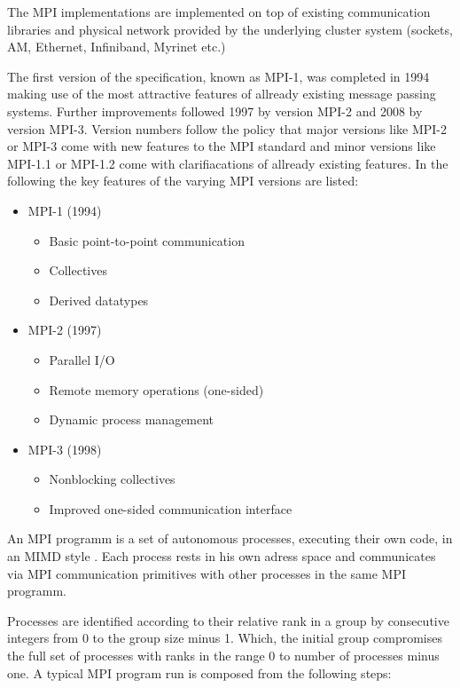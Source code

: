 The MPI implementations are implemented on top of existing communication
libraries and physical network provided by the underlying cluster system (sockets,
AM, Ethernet, Infiniband, Myrinet etc.)

The first version of the specification, known as MPI-1, was completed
in 1994 making use of the most attractive features of allready
existing message passing systems.  Further improvements followed 1997
by version MPI-2 and 2008 by version MPI-3. Version numbers follow
the policy that major versions like MPI-2 or MPI-3 come with new
features to the MPI standard and minor versions like MPI-1.1 or
MPI-1.2 come with clarifiacations of allready existing features. In
the following the key features of the varying MPI versions are listed:

\begin{itemize}
  \item MPI-1 (1994)
    \begin{itemize}
      \item Basic point-to-point communication
      \item Collectives
      \item Derived datatypes
    \end{itemize}
  \item MPI-2 (1997)
    \begin{itemize}
      \item Parallel I/O
      \item Remote memory operations (one-sided)
      \item Dynamic process management
    \end{itemize}
  \item MPI-3 (1998)
    \begin{itemize}
      \item Nonblocking collectives
      \item Improved one-sided communication interface
    \end{itemize}
\end{itemize}

An MPI programm is a set of autonomous processes, executing their own
code, in an MIMD style \cite{Flynn:1972:COE:1952456.1952459}. Each
process rests in his own adress space and communicates via MPI
communication primitives with other processes in the same MPI
programm.

Processes are identified according to their relative rank in a group
by consecutive integers from 0 to the group size minus 1. Which, the
initial group compromises the full set of processes with ranks in the
range 0 to number of processes minus one. A typical MPI program run is
composed from the following steps:

